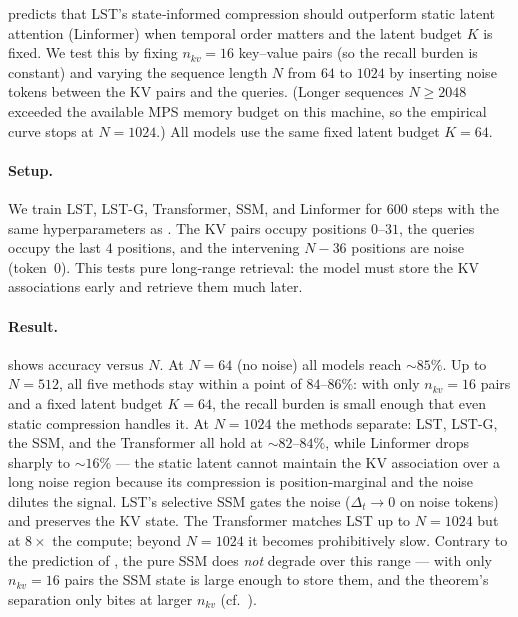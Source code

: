 \documentclass[10pt,twocolumn,letterpaper]{article}
\newcommand{\LST}{\textsc{LST}}
\begin{document}
 predicts that \LST{}'s state‑informed compression should
outperform static latent attention (Linformer) when temporal order matters
and the latent budget $K$ is fixed.  We test this by fixing $n_{kv}\!=\!16$
key–value pairs (so the recall burden is constant) and varying the sequence
length $N$ from $64$ to $1024$ by inserting noise tokens between the KV
pairs and the queries.  (Longer sequences $N\!\ge\!2048$ exceeded the
available MPS memory budget on this machine, so the empirical curve
stops at $N\!=\!1024$.)  All models use the same fixed latent budget
$K\!=\!64$.

\paragraph{Setup.}  We train \LST{}, \LST-G{}, Transformer, SSM, and
Linformer for $600$ steps with the same hyperparameters as
.  The KV pairs occupy positions $0$–$31$, the queries
occupy the last $4$ positions, and the intervening $N\!-\!36$ positions
are noise (token~$0$).  This tests pure long‑range retrieval: the model
must store the KV associations early and retrieve them much later.

\paragraph{Result.}   shows accuracy versus $N$.
At $N\!=\!64$ (no noise) all models reach $\sim\!85\%$.  Up to $N\!=\!512$,
all five methods stay within a point of $84$--$86\%$: with only $n_{kv}\!=\!16$
pairs and a fixed latent budget $K\!=\!64$, the recall burden is small enough
that even static compression handles it.  At $N\!=\!1024$ the methods
separate: \LST{}, \LST-G{}, the SSM, and the Transformer all hold at
$\sim\!82$--$84\%$, while Linformer drops sharply to $\sim\!16\%$ --- the
static latent cannot maintain the KV association over a long noise region
because its compression is position‑marginal and the noise dilutes the
signal.  \LST{}'s selective SSM gates the noise ($\Delta_t\!\to\!0$ on noise
tokens) and preserves the KV state.  The Transformer matches \LST{} up to
$N\!=\!1024$ but at $8\times$ the compute; beyond $N\!=\!1024$ it becomes
prohibitively slow.  Contrary to the prediction of , the pure
SSM does \emph{not} degrade over this range --- with only $n_{kv}\!=\!16$
pairs the SSM state is large enough to store them, and the theorem's
separation only bites at larger $n_{kv}$ (cf.\ ).
\end{document}

